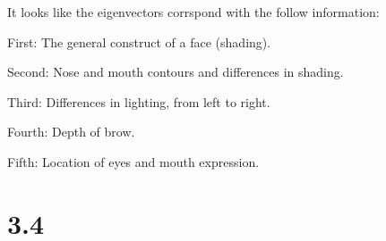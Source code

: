 \documentclass[11pt]{article}
\begin{document}
    \begin{center}
    \end{center}
    { \hspace*{\fill} \\}
    
    \begin{center}
    \end{center}
    { \hspace*{\fill} \\}
    
    \begin{center}
    \end{center}
    { \hspace*{\fill} \\}
    
    \begin{center}
    \end{center}
    { \hspace*{\fill} \\}
    
    \begin{center}
    \end{center}
    { \hspace*{\fill} \\}
    
    It looks like the eigenvectors corrspond with the follow information:

First: The general construct of a face (shading).

Second: Nose and mouth contours and differences in shading.

Third: Differences in lighting, from left to right.

Fourth: Depth of brow.

Fifth: Location of eyes and mouth expression.

    \section{3.4}\label{section}
\end{document}
